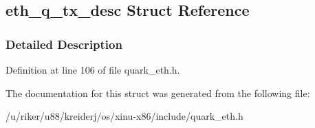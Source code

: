 \hypertarget{structeth__q__tx__desc}{}\subsection{eth\+\_\+q\+\_\+tx\+\_\+desc Struct Reference}
\label{structeth__q__tx__desc}


\subsubsection{Detailed Description}


Definition at line 106 of file quark\+\_\+eth.\+h.



The documentation for this struct was generated from the following file\+:\begin{DoxyCompactItemize}
\item 
/u/riker/u88/kreiderj/os/xinu-\/x86/include/quark\+\_\+eth.\+h\end{DoxyCompactItemize}

